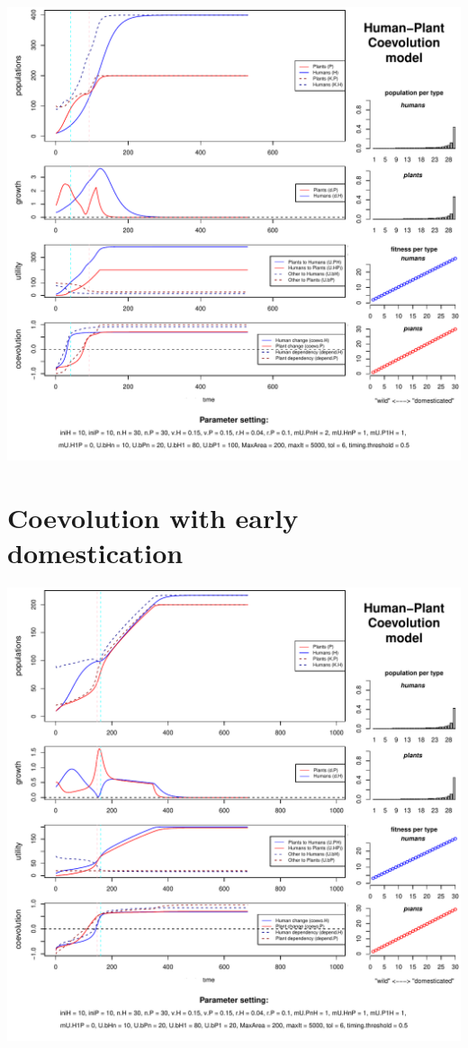 \documentclass[]{book}
\begin{document}
\includegraphics{hpcModel-exploration_files/figure-latex/1_run.coevo.early.cult-plot-1.pdf}

\newpage

\hypertarget{coevolution-with-early-domestication}{%
\section{Coevolution with early domestication}\label{coevolution-with-early-domestication}}

\includegraphics{hpcModel-exploration_files/figure-latex/1_run.coevo.early.dom-plot-1.pdf}
\end{document}
